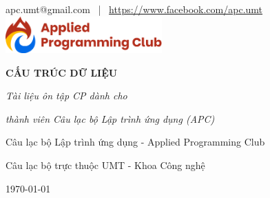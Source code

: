 \begin{titlepage}
\thispagestyle{empty}
\centering

\vspace*{1cm}

{\large apc.umt@gmail.com \, | \, \url{https://www.facebook.com/apc.umt}}\\[1cm]

\includegraphics[width=6cm]{../resource/img/logo.png}\\[3.5cm]
{\fontsize{36}{40}\selectfont\bfseries CẤU TRÚC DỮ LIỆU\par} 
\vspace{0.6cm}
{\fontsize{18}{22}\selectfont\itshape Tài liệu ôn tập CP dành cho \par}
{\fontsize{18}{22}\selectfont\itshape thành viên Câu lạc bộ Lập trình ứng dụng (APC)\par}
\vspace{5cm}

{\Large Câu lạc bộ Lập trình ứng dụng - Applied Programming Club\par}
\vspace{0.4cm}
{\large Câu lạc bộ trực thuộc UMT - Khoa Công nghệ\par}

\vspace{8cm}

{\Large \today\par}

\vfill
\end{titlepage}
